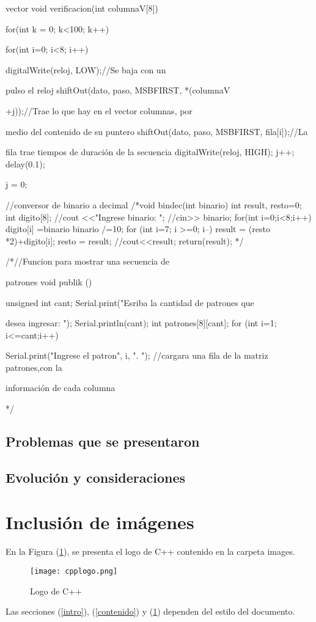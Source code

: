 \documentclass{article}
\begin{document}
vector
void verificacion(int columnaV[8])
{
  for(int k = 0; k<100; k++)
  {
    for(int i=0; i<8; i++)
    {
      digitalWrite(reloj, LOW);//Se baja con un 

pulso el reloj
      shiftOut(dato, paso, MSBFIRST, *(columnaV

+j));//Trae lo que hay en el vector columnas, por 

medio del contenido de su puntero
      shiftOut(dato, paso, MSBFIRST, fila[i]);//La 

fila trae tiempos de duración de la secuencia
      digitalWrite(reloj, HIGH);
      j++;
    delay(0.1);  
    }
    j = 0;
    
  }
  
}
//conversor de binario a decimal
/*void bindec(int binario){
    int result, resto=0;
    int digito[8];
    //cout <<"Ingrese binario: ";
    //cin>> binario;
    for(int i=0;i<8;i++){
        digito[i] =binario %
        binario /=10;
    }
    for (int i=7; i >=0; i--){
        result = (resto *2)+digito[i];
        resto = result;
     }
        //cout<<result;
 return(result);
} */           

/*//Funcion para mostrar una secuencia de 

patrones
void publik (){
  unsigned int cant;
  Serial.print("Esriba la cantidad de patrones que 

desea ingresar: ");
  Serial.println(cant);
  int patrones[8][cant];
  for (int i=1; i<=cant;i++)
  {
    Serial.print("Ingrese el patron", i, ". ");
    //cargara una fila de la matriz patrones,con la 

información de cada columna
  }
}*/


\subsection{Problemas que se presentaron}

\subsection{Evolución y consideraciones}

\section{Inclusión de imágenes} \label{imagenes}

En la Figura (\ref{fig:cpplogo}), se presenta el logo de C++ contenido en la carpeta images.

\begin{figure}[h]
\texttt{[image: cpplogo.png]}
\centering
\caption{Logo de C++}
\label{fig:cpplogo}
\end{figure}

Las secciones (\ref{intro}), (\ref{contenido}) y (\ref{imagenes}) dependen del estilo del documento.



\end{document}

